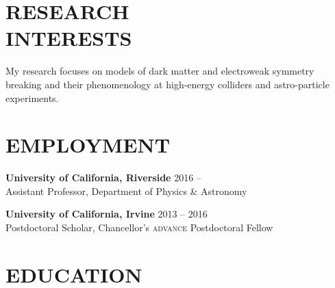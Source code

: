 \documentclass[margin,line]{resume}
\newcommand{\mydate}{}
\begin{document}
\begin{resume}
\section{\footnotesize \sc \sffamily 
{}RESEARCH\\INTERESTS}


My research focuses on models of dark matter and electroweak symmetry breaking and their phenomenology at high-energy colliders and astro-particle experiments. 

\vspace{-3mm}

\section{\footnotesize \sc
\sffamily 
{}EMPLOYMENT
}



\textbf{University of California, Riverside} %
\hfill 
{\mydate 
2016 -- \phantom{2016}
}\vspace{-3mm}\\

\vspace{-6mm}
Assistant Professor, Department of Physics \& Astronomy   %
\vspace{-3mm}

\textbf{University of California, Irvine} %
\hfill 
{\mydate 
2013 -- 2016
}\vspace{-3mm}\\

\vspace{-6mm}
Postdoctoral Scholar, Chancellor's \textsc{advance} Postdoctoral Fellow   %
\vspace{-3mm}



\section{\footnotesize \sc
\sffamily 
{}
EDUCATION
}



\end{resume}
\end{document}
